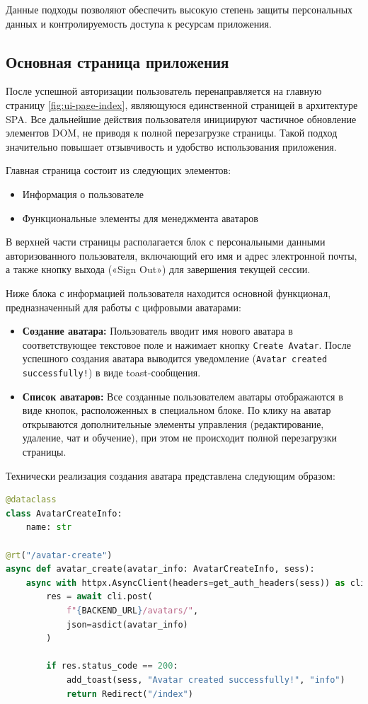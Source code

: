 Данные подходы позволяют обеспечить высокую степень защиты персональных данных и контролируемость 
доступа к ресурсам приложения.

\subsection{Основная страница приложения}

После успешной авторизации пользователь перенаправляется на главную страницу \ref{fig:ui-page-index}, являющуюся единственной страницей в архитектуре SPA. Все дальнейшие действия 
пользователя инициируют частичное обновление элементов DOM, не приводя к полной перезагрузке 
страницы. Такой подход значительно повышает отзывчивость и удобство использования приложения.


Главная страница состоит из следующих элементов:
\begin{itemize}
    \item Информация о пользователе
    \item Функциональные элементы для менеджмента аватаров
\end{itemize}


В верхней части страницы располагается блок с персональными данными авторизованного пользователя, 
включающий его имя и адрес электронной почты, а также кнопку выхода («Sign Out») для завершения 
текущей сессии.


Ниже блока с информацией пользователя находится основной функционал, предназначенный для работы с 
цифровыми аватарами:

\begin{itemize}
  \item \textbf{Создание аватара:} Пользователь вводит имя нового аватара в соответствующее 
        текстовое поле и нажимает кнопку \texttt{Create Avatar}. После успешного создания 
        аватара выводится уведомление (\texttt{Avatar created successfully!}) в виде 
        toast-сообщения.
  \item \textbf{Список аватаров:} Все созданные пользователем аватары отображаются в виде 
        кнопок, расположенных в специальном блоке. По клику на аватар открываются дополнительные 
        элементы управления (редактирование, удаление, чат и обучение), при этом не происходит 
        полной перезагрузки страницы.
\end{itemize}


Технически реализация создания аватара представлена следующим образом:

\begin{lstlisting}[language=Python, numbers=none, frame=none]
@dataclass
class AvatarCreateInfo:
    name: str

@rt("/avatar-create")
async def avatar_create(avatar_info: AvatarCreateInfo, sess):
    async with httpx.AsyncClient(headers=get_auth_headers(sess)) as cli:
        res = await cli.post(
            f"{BACKEND_URL}/avatars/", 
            json=asdict(avatar_info)
        )

        if res.status_code == 200:
            add_toast(sess, "Avatar created successfully!", "info")
            return Redirect("/index")
\end{lstlisting}


